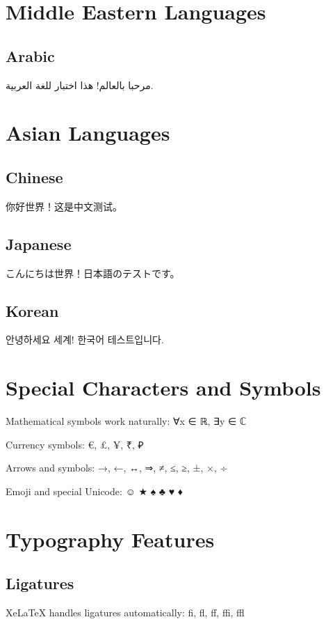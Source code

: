 \documentclass[12pt,a4paper]{article}
\newcommand{\textcjk}[1]{{\cjkfont #1}}
\begin{document}
\section{Middle Eastern Languages}

\subsection{Arabic}
\begin{arabic}
مرحبا بالعالم! هذا اختبار للغة العربية.
\end{arabic}

\section{Asian Languages}

\subsection{Chinese}
\textcjk{你好世界！这是中文测试。}

\subsection{Japanese}
\textcjk{こんにちは世界！日本語のテストです。}

\subsection{Korean}
\textcjk{안녕하세요 세계! 한국어 테스트입니다.}

\section{Special Characters and Symbols}

Mathematical symbols work naturally: ∀x ∈ ℝ, ∃y ∈ ℂ

Currency symbols: €, £, ¥, ₹, ₽

Arrows and symbols: →, ←, ↔, ⇒, ≠, ≤, ≥, ±, ×, ÷

Emoji and special Unicode: ☺ ★ ♠ ♣ ♥ ♦

\section{Typography Features}

\subsection{Ligatures}
XeLaTeX handles ligatures automatically: fi, fl, ff, ffi, ffl
\end{document}
